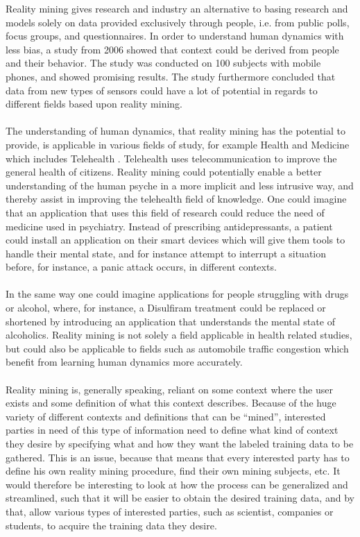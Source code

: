Reality mining gives research and industry an alternative to basing research and models solely on data provided exclusively through people, i.e. from public polls, focus groups, and questionnaires. In order to understand human dynamics with less bias, a study from 2006 \parencite{eagle2006_reality_mining_definition} showed that context could be derived from people and their behavior. The study was conducted on 100 subjects with mobile phones, and showed promising results. The study furthermore concluded that data from new types of sensors could have a lot of potential in regards to different fields based upon reality mining. 
\\\\
The understanding of human dynamics, that reality mining has the potential to provide, is applicable in various fields of study, for example Health and Medicine \parencite{pentland2009_reality_mining_health_medicine} which includes Telehealth \parencite{telehealth_aau}. Telehealth uses telecommunication to improve the general health of citizens. Reality mining could potentially enable a better understanding of the human psyche in a more implicit and less intrusive way, and thereby assist in improving the telehealth field of knowledge. One could imagine that an application that uses this field of research could reduce the need of medicine used in psychiatry. Instead of prescribing antidepressants, a patient could install an application on their smart devices which will give them tools to handle their mental state, and for instance attempt to interrupt a situation before, for instance, a panic attack occurs, in different contexts. 
\\\\
In the same way one could imagine applications for people struggling with drugs or alcohol, where, for instance, a Disulfiram \parencite{nlm_disulfiram} treatment could be replaced or shortened by introducing an application that understands the mental state of alcoholics. Reality mining is not solely a field applicable in health related studies, but could also be applicable to fields such as automobile traffic congestion \parencite{pentland2009reality_mining_mobile_communication_gps} which benefit from learning human dynamics more accurately.
\\\\
Reality mining is, generally speaking, reliant on some context where the user exists and some definition of what this context describes. Because of the huge variety of different contexts and definitions that can be ``mined'', interested parties in need of this type of information need to define what kind of context they desire by specifying what and how they want the labeled training data to be gathered. This is an issue, because that means that every interested party has to define his own reality mining procedure, find their own mining subjects, etc. It would therefore be interesting to look at how the process can be generalized and streamlined, such that it will be easier to obtain the desired training data, and by that, allow various types of interested parties, such as scientist, companies or students, to acquire the training data they desire.
